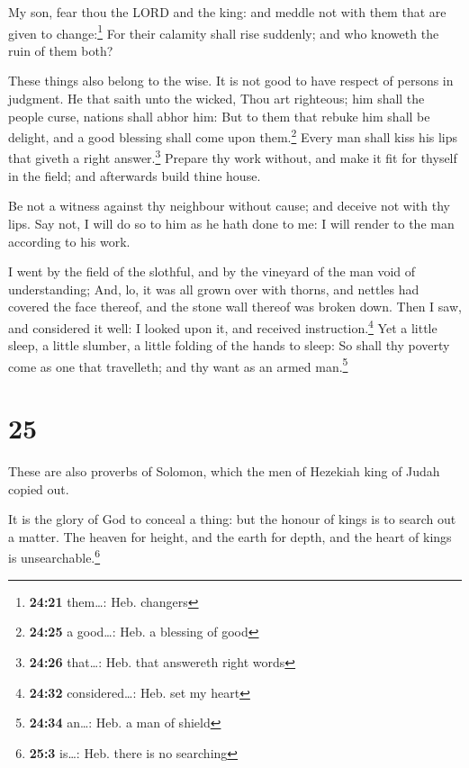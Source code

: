  My son, fear thou the LORD and the king: and meddle not
with them that are given to change:\footnote{\textbf{24:21} them\ldots:
  Heb. changers}  For their calamity shall rise suddenly;
and who knoweth the ruin of them both?

 These things also belong to the wise. It is not good to
have respect of persons in judgment.  He that saith unto
the wicked, Thou art righteous; him shall the people curse, nations
shall abhor him:  But to them that rebuke him shall be
delight, and a good blessing shall come upon them.\footnote{\textbf{24:25}
  a good\ldots: Heb. a blessing of good}  Every man shall
kiss his lips that giveth a right answer.\footnote{\textbf{24:26}
  that\ldots: Heb. that answereth right words}  Prepare
thy work without, and make it fit for thyself in the field; and
afterwards build thine house.

 Be not a witness against thy neighbour without cause;
and deceive not with thy lips.  Say not, I will do so to
him as he hath done to me: I will render to the man according to his
work.

 I went by the field of the slothful, and by the vineyard
of the man void of understanding;  And, lo, it was all
grown over with thorns, and nettles had covered the face thereof, and
the stone wall thereof was broken down.  Then I saw, and
considered it well: I looked upon it, and received
instruction.\footnote{\textbf{24:32} considered\ldots: Heb. set my heart}
 Yet a little sleep, a little slumber, a little folding
of the hands to sleep:  So shall thy poverty come as one
that travelleth; and thy want as an armed man.\footnote{\textbf{24:34}
  an\ldots: Heb. a man of shield}

\hypertarget{section-24}{%
\section{25}\label{section-24}}

 These are also proverbs of Solomon, which the men of
Hezekiah king of Judah copied out.

 It is the glory of God to conceal a thing: but the honour
of kings is to search out a matter.  The heaven for
height, and the earth for depth, and the heart of kings is
unsearchable.\footnote{\textbf{25:3} is\ldots: Heb. there is no
  searching}

